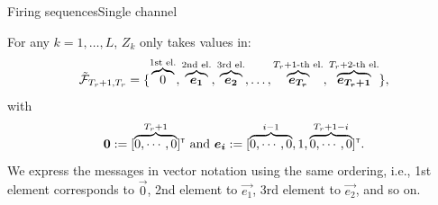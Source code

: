 \documentclass{beamer}
\begin{document}



	\begin{frame}{Firing sequences}{Single channel}
		\begin{proofs}[\proofname \ (2/4)]
			\justifying
			For any $k = 1, \dots, L$, $Z_k$ only takes values in:
			\begin{equation*}
				\mathcal{\tilde{F}}_{T_r + 1, T_r} = \{\overbrace{0}^{\text{1st el.}}, \overbrace{\bm{e_1}}^{\text{2nd el.}}, \overbrace{\bm{e_2}}^{\text{3rd el.}}, \dots, \overbrace{\bm{e_{T_r}}}^{T_r + 1\text{-th el.}}, \overbrace{\bm{e_{T_r + 1}}}^{T_r + 2\text{-th el.}}\},
			\end{equation*} 
			with 
			\begin{equation*}
				\bm{0} := [\overbrace{0, \cdots, 0}^{T_r + 1}]^{\textnormal{\textsf{\tiny T}}} \text{ and } \bm{e_i} := [\overbrace{0, \cdots, 0}^{i-1}, 1, \overbrace{0, \cdots, 0}^{T_r + 1 - i}]^{\textnormal{\textsf{\tiny T}}}.
			\end{equation*} 
			We express the messages in vector notation using the same ordering, i.e., 1st element corresponds to $\vec{0}$, 2nd element to $\vec{e_1}$, 3rd element to $\vec{e_2}$, and so on.
		\end{proofs} 
	\end{frame}
\end{document}
